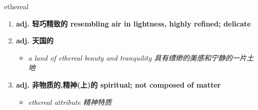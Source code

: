 
\begin{frame}
{\huge ethereal}
\begin{center}
\begin{enumerate}\Large
  \item \textbf{adj. 轻巧精致的 resembling air in lightness, highly refined; delicate}
  \item \textbf{adj. 天国的}
  \begin{itemize}
    \item \em{\Large{a land of ethereal beauty and tranquility 具有缥缈的美感和宁静的一片土地}}
  \end{itemize}
  \item \textbf{adj. 非物质的,精神(上)的 spiritual; not composed of matter}
  \begin{itemize}
    \item \em{\Large{ethereal attribute 精神特质}}
  \end{itemize}
\end{enumerate}
\end{center}
\end{frame}
